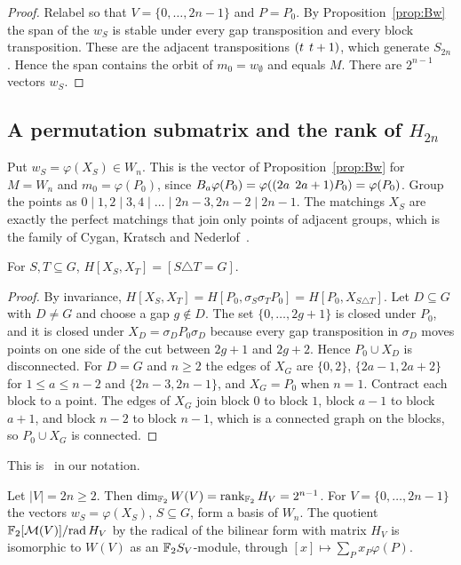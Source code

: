 \begin{proof}
Relabel so that $V=\{0,\dots,2n-1\}$ and $P=P_0$. By Proposition~\ref{prop:Bw} the span of the $w_S$ is stable under every gap transposition and every block transposition. These are the adjacent transpositions $(t\;\,t+1)$, which generate $S_{2n}$. Hence the span contains the orbit of $m_0=w_\emptyset$ and equals $M$. There are $2^{n-1}$ vectors $w_S$.
\end{proof}

\subsection{A permutation submatrix and the rank of \texorpdfstring{$H_{2n}$}{H\_2n}}

Put $w_S=\varphi(X_S)\in W_n$. This is the vector of Proposition~\ref{prop:Bw} for $M=W_n$ and $m_0=\varphi(P_0)$, since $B_a\varphi(P_0)=\varphi((2a\;\,2a+1)P_0)=\varphi(P_0)$. Group the points as $0\mid1,2\mid3,4\mid\dots\mid2n-3,2n-2\mid2n-1$. The matchings $X_S$ are exactly the perfect matchings that join only points of adjacent groups, which is the family of Cygan, Kratsch and Nederlof~\cite[Def.~3.1, Prop.~3.2]{CKN18}.

\begin{lemma}\label{lem:HX}
For $S,T\subseteq G$, $H[X_S,X_T]=[S\triangle T=G]$.
\end{lemma}

\begin{proof}
By invariance, $H[X_S,X_T]=H[P_0,\sigma_S\sigma_{T}P_0]=H[P_0,X_{S\triangle T}]$. Let $D\subseteq G$ with $D\ne G$ and choose a gap $g\notin D$. The set $\{0,\dots,2g+1\}$ is closed under $P_0$, and it is closed under $X_D=\sigma_{D}P_0\sigma_D$ because every gap transposition in $\sigma_D$ moves points on one side of the cut between $2g+1$ and $2g+2$. Hence $P_0\cup X_D$ is disconnected. For $D=G$ and $n\ge2$ the edges of $X_G$ are $\{0,2\}$, $\{2a-1,2a+2\}$ for $1\le a\le n-2$ and $\{2n-3,2n-1\}$, and $X_G=P_0$ when $n=1$. Contract each block to a point. The edges of $X_G$ join block $0$ to block $1$, block $a-1$ to block $a+1$, and block $n-2$ to block $n-1$, which is a connected graph on the blocks, so $P_0\cup X_G$ is connected.
\end{proof}

This is~\cite[Prop.~3.3]{CKN18} in our notation.

\begin{theorem}\label{thm:rank}
Let $|V|=2n\ge2$. Then $\dim_{\mathbb{F}_2}W(V)=\operatorname{rank}_{\mathbb{F}_2}H_V=2^{n-1}$. For $V=\{0,\dots,2n-1\}$ the vectors $w_S=\varphi(X_S)$, $S\subseteq G$, form a basis of $W_n$. The quotient $\mathbb{F}_2[\mathcal{M}(V)]/{\operatorname{rad} H_V}$ by the radical of the bilinear form with matrix $H_V$ is isomorphic to $W(V)$ as an $\mathbb{F}_2 S_V$-module, through $[x]\mapsto\sum_{P}x_P\varphi(P)$.
\end{theorem}

